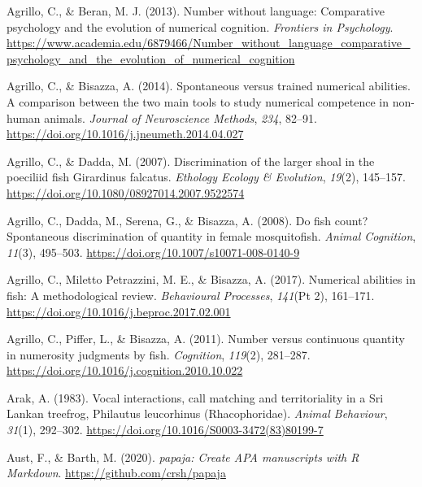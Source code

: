 \documentclass[
  ,doc,floatsintext]{apa6}
\newlength{\cslhangindent}
\newlength{\cslentryspacingunit} %
\newenvironment{CSLReferences}[2] %
 {%
  \setlength{\parindent}{0pt}
  \ifodd #1
  \let\oldpar\par
  \def\par{\hangindent=\cslhangindent\oldpar}
  \fi
  \setlength{\parskip}{#2\cslentryspacingunit}
 }%
 {}
\begin{document}
\hypertarget{refs}{}
\begin{CSLReferences}{1}{0}
\leavevmode{}%
Agrillo, C., \& Beran, M. J. (2013). Number without language: Comparative psychology and the evolution of numerical cognition. \emph{Frontiers in Psychology}. \url{https://www.academia.edu/6879466/Number_without_language_comparative_psychology_and_the_evolution_of_numerical_cognition}

\leavevmode{}%
Agrillo, C., \& Bisazza, A. (2014). Spontaneous versus trained numerical abilities. {A} comparison between the two main tools to study numerical competence in non-human animals. \emph{Journal of Neuroscience Methods}, \emph{234}, 82--91. \url{https://doi.org/10.1016/j.jneumeth.2014.04.027}

\leavevmode{}%
Agrillo, C., \& Dadda, M. (2007). Discrimination of the larger shoal in the poeciliid fish {Girardinus} falcatus. \emph{Ethology Ecology \& Evolution}, \emph{19}(2), 145--157. \url{https://doi.org/10.1080/08927014.2007.9522574}

\leavevmode{}%
Agrillo, C., Dadda, M., Serena, G., \& Bisazza, A. (2008). Do fish count? {Spontaneous} discrimination of quantity in female mosquitofish. \emph{Animal Cognition}, \emph{11}(3), 495--503. \url{https://doi.org/10.1007/s10071-008-0140-9}

\leavevmode{}%
Agrillo, C., Miletto Petrazzini, M. E., \& Bisazza, A. (2017). Numerical abilities in fish: {A} methodological review. \emph{Behavioural Processes}, \emph{141}(Pt 2), 161--171. \url{https://doi.org/10.1016/j.beproc.2017.02.001}

\leavevmode{}%
Agrillo, C., Piffer, L., \& Bisazza, A. (2011). Number versus continuous quantity in numerosity judgments by fish. \emph{Cognition}, \emph{119}(2), 281--287. \url{https://doi.org/10.1016/j.cognition.2010.10.022}

\leavevmode{}%
Arak, A. (1983). Vocal interactions, call matching and territoriality in a {Sri} {Lankan} treefrog, {Philautus} leucorhinus ({Rhacophoridae}). \emph{Animal Behaviour}, \emph{31}(1), 292--302. \url{https://doi.org/10.1016/S0003-3472(83)80199-7}

\leavevmode{}%
Aust, F., \& Barth, M. (2020). \emph{{papaja}: {Create} {APA} manuscripts with {R Markdown}}. \url{https://github.com/crsh/papaja}


\end{CSLReferences}
\end{document}
